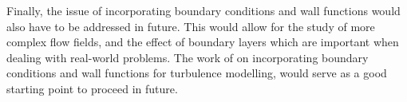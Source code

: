 Finally, the issue of incorporating boundary conditions and wall functions would also have to be addressed in future. This would allow for the study of more complex flow fields, and the effect of boundary layers which are important when dealing with real-world problems. The work of \cite{Mayrhofer2014} on incorporating boundary conditions and wall functions for turbulence modelling, would serve as a good starting point to proceed in future.

